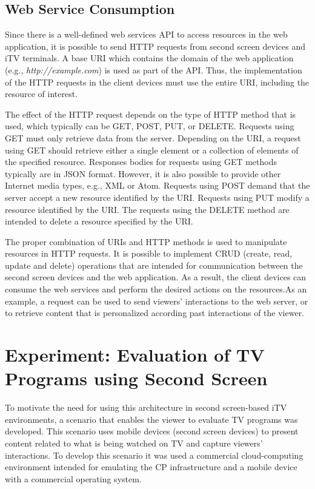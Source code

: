 \documentclass[journal]{IEEEtran}
\begin{document}
\subsection{Web Service Consumption}

Since there is a well-defined web services API to access resources in the web application, it is possible to send HTTP requests from second screen devices and iTV terminals. A base URI which contains the domain of the web application (e.g., \emph{http://example.com}) is used as part of the API. Thus, the implementation of the HTTP requests in the client devices must use the entire URI, including the resource of interest.

The effect of the HTTP request depends on the type of HTTP method that is used, which typically can be GET, POST, PUT, or DELETE. Requests using GET must only retrieve data from the server. Depending on the URI, a request using GET should retrieve either a single element or a collection of elements of the specified resource. Responses bodies for requests using GET methods typically are in JSON format. However, it is also possible to provide other Internet media types, e.g., XML or Atom. Requests using POST demand that the server accept a new resource identified by the URI. Requests using PUT modify a resource identified by the URI. The requests using the DELETE method are intended to delete a resource specified by the URI.

The proper combination of URIs and HTTP methods is used to manipulate resources in HTTP requests. It is possible to implement CRUD (create, read, update and delete) operations that are intended for communication between the second screen devices and the web application. As a result, the client devices can consume the web services and perform the desired actions on the resources.As an example, a request can be used to send viewers' interactions to the web server, or to retrieve content that is personalized according past interactions of the viewer.

\section{Experiment: Evaluation of TV Programs using Second Screen}
\label{sec_experiment}


To motivate the need for using this architecture in second screen-based iTV environments, a scenario that enables the viewer to evaluate TV programs was developed. This scenario uses mobile devices (second screen devices) to present content related to what is being watched on TV and capture viewers' interactions. To develop this scenario it was used a commercial cloud-computing environment intended for emulating the CP infrastructure and a mobile device with a commercial operating system.
\end{document}
